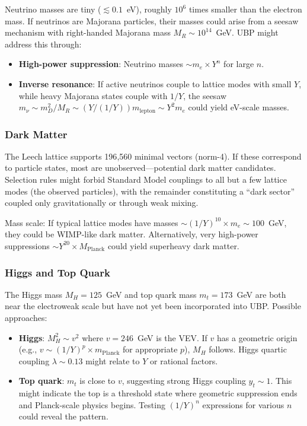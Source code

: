 \documentclass[11pt,a4paper]{article}
\begin{document}
Neutrino masses are tiny ($\lesssim 0.1$~eV), roughly $10^6$ times smaller than the electron mass. If neutrinos are Majorana particles, their masses could arise from a seesaw mechanism with right-handed Majorana mass $M_R \sim 10^{14}$~GeV. UBP might address this through:
\begin{itemize}
\item \textbf{High-power suppression}: Neutrino masses $\sim m_e \times Y^n$ for large $n$.
\item \textbf{Inverse resonance}: If active neutrinos couple to lattice modes with small $Y$, while heavy Majorana states couple with $1/Y$, the seesaw $m_\nu \sim m_D^2 / M_R \sim (Y / (1/Y)) m_{\text{lepton}} \sim Y^2 m_e$ could yield eV-scale masses.
\end{itemize}

\subsubsection{Dark Matter}

The Leech lattice supports 196{,}560 minimal vectors (norm-4). If these correspond to particle states, most are unobserved—potential dark matter candidates. Selection rules might forbid Standard Model couplings to all but a few lattice modes (the observed particles), with the remainder constituting a ``dark sector'' coupled only gravitationally or through weak mixing.

Mass scale: If typical lattice modes have masses $\sim (1/Y)^{10} \times m_e \sim 100$~GeV, they could be WIMP-like dark matter. Alternatively, very high-power suppressions $\sim Y^{20} \times M_{\text{Planck}}$ could yield superheavy dark matter.

\subsubsection{Higgs and Top Quark}

The Higgs mass $M_H = 125$~GeV and top quark mass $m_t = 173$~GeV are both near the electroweak scale but have not yet been incorporated into UBP. Possible approaches:
\begin{itemize}
\item \textbf{Higgs}: $M_H^2 \sim v^2$ where $v = 246$~GeV is the VEV. If $v$ has a geometric origin (e.g., $v \sim (1/Y)^p \times m_{\text{Planck}}$ for appropriate $p$), $M_H$ follows. Higgs quartic coupling $\lambda \sim 0.13$ might relate to $Y$ or rational factors.

\item \textbf{Top quark}: $m_t$ is close to $v$, suggesting strong Higgs coupling $y_t \sim 1$. This might indicate the top is a threshold state where geometric suppression ends and Planck-scale physics begins. Testing $(1/Y)^n$ expressions for various $n$ could reveal the pattern.
\end{itemize}
\end{document}
